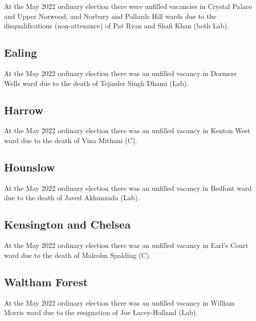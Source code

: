 \documentclass[a4paper,openany]{book}
\begin{document}
\begin{resultsiii}
At the May 2022 ordinary election there were unfilled vacancies in Crystal Palace and Upper Norwood, and Norbury and Pollards Hill wards due to the disqualifications (non-attenance) of Pat Ryan and Shafi Khan (both Lab).%
%

\subsection*{Ealing}

At the May 2022 ordinary election there was an unfilled vacancy in Dormers Wells ward due to the death of Tejinder Singh Dhami (Lab).%

\subsection*{Harrow}

At the May 2022 ordinary election there was an unfilled vacancy in Kenton West ward due to the death of Vina Mithani (C).%

\subsection*{Hounslow}

At the May 2022 ordinary election there was an unfilled vacancy in Bedfont ward due to the death of Javed Akhunzada (Lab).%

\subsection*{Kensington and Chelsea}

At the May 2022 ordinary election there was an unfilled vacancy in Earl's Court ward due to the death of Malcolm Spalding (C).%

\subsection*{Waltham Forest}

At the May 2022 ordinary election there was an unfilled vacancy in William Morris ward due to the resignation of Joe Lacey-Holland (Lab).%


\end{resultsiii}
\end{document}
